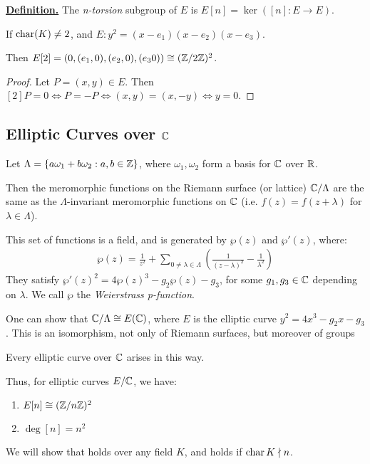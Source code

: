 \documentclass[10pt,a4paper]{article}
\begin{document}
\underline{\textbf{Definition.}} The \emph{n-torsion} subgroup of $E$ is $E[n] = \ker([n]:E\to E)$.

\begin{lemma}
  If $\operatorname{char}(K) \neq 2$, and $E : y^2 = (x-e_1)(x-e_2)(x-e_3)$.

  Then $E[2] = (0, (e_1, 0), (e_2, 0), (e_3 0)) \cong (\mathbb{Z}/2\mathbb{Z})^2$.
\end{lemma}
\begin{proof}
  Let $P = (x, y) \in E$. Then $[2]P = 0 \iff P = -P \iff (x, y) = (x, -y) \iff y = 0$.
\end{proof}

\subsection{Elliptic Curves over $\mathbb{C}$}
Let $\Lambda = \{a\omega_1 + b\omega_2 : a, b \in \mathbb{Z}\}$, where $\omega_1, \omega_2$ form a basis for $\mathbb{C}$ over $\mathbb{R}$.

Then the meromorphic functions on the Riemann surface (or lattice) $\mathbb{C}/\Lambda$ are the same as the $\Lambda$-invariant meromorphic functions on $\mathbb{C}$ (i.e. $f(z) = f(z+\lambda)$ for $\lambda \in \Lambda$).

This set of functions is a field, and is generated by $\wp(z)$ and $\wp'(z)$, where:
\begin{align*}
  \wp(z) = \frac{1}{z^2} + \sum_{0 \neq \lambda\in\Lambda} \left(\frac{1}{(z-\lambda)^2} - \frac{1}{\lambda^2}\right)
\end{align*}
They satisfy $\wp'(z)^2 = 4\wp(z)^3-g_2\wp(z)-g_3$, for some $g_1, g_3 \in \mathbb{C}$ depending on $\lambda$. We call $\wp$ the \emph{Weierstrass p-function}.

One can show that $\mathbb{C}/\Lambda \cong E(\mathbb{C})$, where $E$ is the elliptic curve $y^2=4x^3-g_2x-g_3$. This is an isomorphism, not only of Riemann surfaces, but moreover of groups

\begin{theorem}
  Every elliptic curve over $\mathbb{C}$ arises in this way.
\end{theorem}

Thus, for elliptic curves $E/\mathbb{C}$, we have:
\begin{enumerate}[label=\protect\circled{\arabic*}]
  \item $E[n] \cong (\mathbb{Z}/n\mathbb{Z})^2$
  \item $\deg[n] = n^2$
\end{enumerate}
We will show that  holds over any field $K$, and  holds if $\operatorname{char} K \nmid n$.
\end{document}
